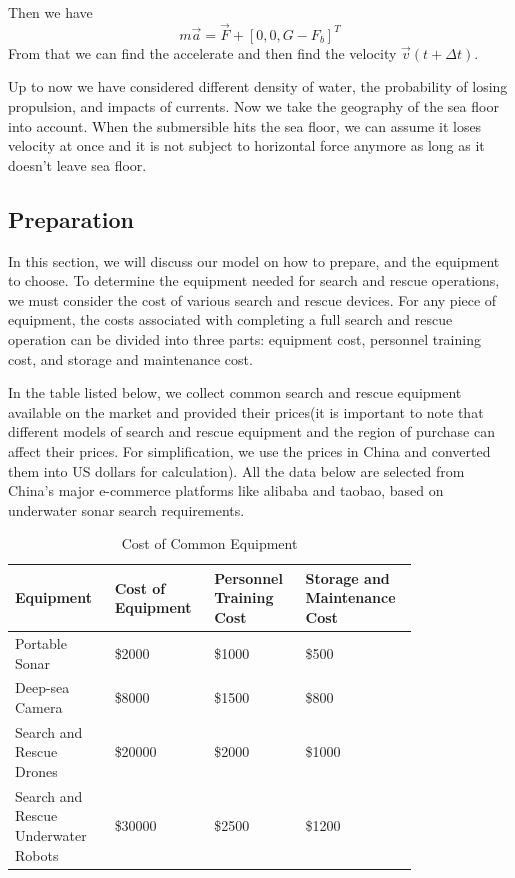 \documentclass[12pt]{article}
\begin{document}
Then we have 
$$m\vec{a}=\Vec{F}+[0,0,G-F_{b}]^{T}$$
From that we can find the accelerate and then find the velocity $\vec{v}(t+\Delta t)$.

Up to now we have considered different density of water, the probability of losing propulsion, and impacts of currents. Now we take the geography of the sea floor into account. When the submersible hits the sea floor, we can assume it loses velocity at once and it is not subject to horizontal force anymore as long as it doesn't leave sea floor.

\subsection{Preparation}
In this section, we will discuss our model on how to prepare, and the equipment to choose. To determine the equipment needed for search and rescue operations, we must consider the cost of various search and rescue devices. For any piece of equipment, the costs associated with completing a full search and rescue operation can be divided into three parts: equipment cost, personnel training cost, and storage and maintenance cost.

In the table listed below, we collect common search and rescue equipment available on the market and provided their prices(it is important to note that different models of search and rescue equipment and the region of purchase can affect their prices. For simplification, we use the prices in China and converted them into US dollars for calculation). All the data below are selected from China's major e-commerce platforms like alibaba and taobao, based on underwater sonar search requirements.

\begin{table}[H]

\begin{tabular}{|>{\centering\arraybackslash}p{0.2\linewidth}|>{\centering\arraybackslash}p{0.2\linewidth}|>{\centering\arraybackslash}p{0.2\linewidth}|>{\centering\arraybackslash}p{0.2\linewidth}|} \hline  
Equipment                           & Cost of Equipment & Personnel Training Cost & Storage and Maintenance Cost\\ \hline  
Portable Sonar                      & \$2000            & \$1000                  & \$500                   \\ \hline  
Deep-sea Camera                     & \$8000            & \$1500                  & \$800                   \\ \hline  
Search and Rescue Drones            & \$20000           & \$2000                  & \$1000                  \\ \hline  
Search and Rescue Underwater Robots & \$30000           & \$2500                  & \$1200                 
 \\ \hline \end{tabular}
\caption{Cost of Common Equipment}
\label{tab:my_table}
\end{table}
\end{document}

